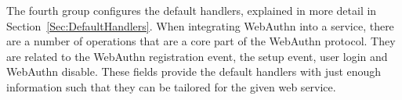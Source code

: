 



The fourth group configures the default handlers, explained in more detail in Section~\ref{Sec:DefaultHandlers}. When integrating WebAuthn into a service, there are a number of operations that are a core part of the WebAuthn protocol. They are related to the WebAuthn registration event, the setup event, user login and WebAuthn disable. These fields provide the default handlers with just enough information such that they can be tailored for the given web service.







